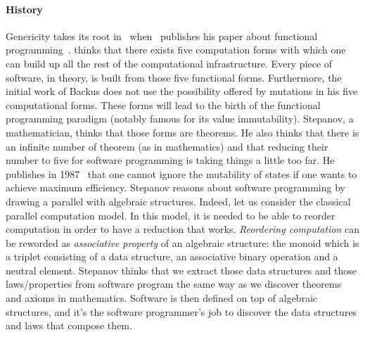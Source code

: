 \paragraph{History} Genericity takes its root in~
when~\citeauthor{backus.1978.functional} publishes his paper about functional
programming~\parencite{backus.1978.functional}. \citeauthor{backus.1978.functional} thinks that there exists five
computation forms with which one can build up all the rest of the computational infrastructure. Every piece of software,
in theory, is built from those five functional forms. Furthermore, the initial work of Backus does not use the
possibility offered by mutations in his five computational forms. These forms will lead to the birth of the functional
programming paradigm (notably famous for its value immutability). Stepanov, a mathematician, thinks that those forms are
theorems. He also thinks that there is an infinite number of theorem (as in mathematics) and that reducing their number
to five for software programming is taking things a little too far. He publishes in
1987~\parencite{stepanov.1987.higher} that one cannot ignore the mutability of states if one wants to achieve maximum
efficiency. Stepanov reasons about software programming by drawing a parallel with algebraic structures. Indeed, let us
consider the classical parallel computation model. In this model, it is needed to be able to reorder computation in
order to have a reduction that works. \emph{Reordering computation} can be reworded as \emph{associative property} of an
algebraic structure: the monoid which is a triplet consisting of a data structure, an associative binary operation and a
neutral element. Stepanov thinks that we extract those data structures and those laws/properties from software program
the same way as we discover theorems and axioms in mathematics. Software is then defined on top of algebraic structures,
and it's the software programmer's job to discover the data structures and laws that compose them.

